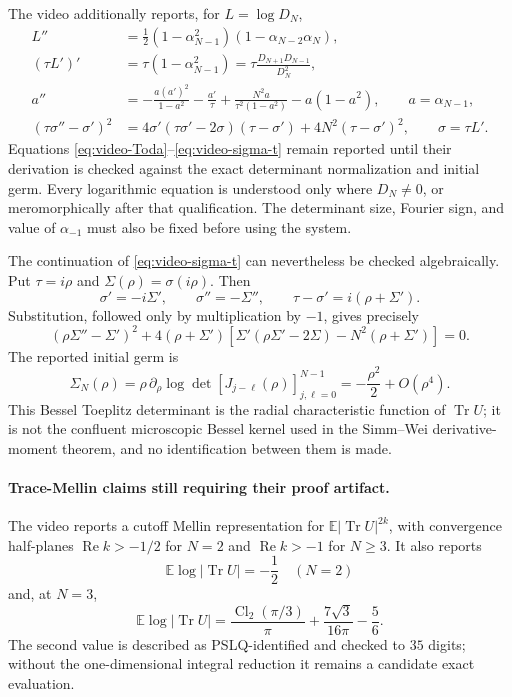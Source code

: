 The video additionally reports, for $L=\log D_N$,
\begin{align}
 L''
 &=\frac12(1-\alpha_{N-1}^2)(1-\alpha_{N-2}\alpha_N),
 \label{eq:video-Toda}\\
 (\tau L')'
 &=\tau(1-\alpha_{N-1}^2)
   =\tau\frac{D_{N+1}D_{N-1}}{D_N^2},
 \label{eq:video-TW-Dodgson}\\
 a''
 &=-\frac{a(a')^2}{1-a^2}-\frac{a'}{\tau}
   +\frac{N^2a}{\tau^2(1-a^2)}-a(1-a^2),
 \qquad a=\alpha_{N-1},
 \label{eq:video-PIII-a}\\
 (\tau\sigma''-\sigma')^2
 &=4\sigma'(\tau\sigma'-2\sigma)(\tau-\sigma')
   +4N^2(\tau-\sigma')^2,
 \qquad \sigma=\tau L'.
 \label{eq:video-sigma-t}
\end{align}
Equations \eqref{eq:video-Toda}--\eqref{eq:video-sigma-t} remain reported until their
derivation is checked against the exact determinant normalization and initial germ.
Every logarithmic equation is understood only where $D_N\neq0$, or meromorphically after
that qualification.  The determinant size, Fourier sign, and value of $\alpha_{-1}$ must
also be fixed before using the system.

The continuation of \eqref{eq:video-sigma-t} can nevertheless be checked algebraically.
Put $\tau=i\rho$ and $\Sigma(\rho)=\sigma(i\rho)$.  Then
\[
 \sigma'=-i\Sigma',\qquad \sigma''=-\Sigma'',
 \qquad \tau-\sigma'=i(\rho+\Sigma').
\]
Substitution, followed only by multiplication by $-1$, gives precisely
\begin{equation}
 (\rho\Sigma''-\Sigma')^2
 +4(\rho+\Sigma')
  \left[\Sigma'(\rho\Sigma'-2\Sigma)-N^2(\rho+\Sigma')\right]=0.
 \label{eq:video-sigma-rho}
\end{equation}
The reported initial germ is
\[
 \Sigma_N(\rho)=\rho\,\partial_\rho
 \log\det[J_{j-\ell}(\rho)]_{j,\ell=0}^{N-1}
 =-\frac{\rho^2}{2}+O(\rho^4).
\]
This Bessel Toeplitz determinant is the radial characteristic function of
$\operatorname{Tr}U$; it is not the confluent microscopic Bessel kernel used in the
Simm--Wei derivative-moment theorem, and no identification between them is made.

\paragraph{Trace-Mellin claims still requiring their proof artifact.}
The video reports a cutoff Mellin representation for
$\mathbb E|\operatorname{Tr}U|^{2k}$, with convergence half-planes
$\operatorname{Re}k>-1/2$ for $N=2$ and $\operatorname{Re}k>-1$ for $N\geq3$.
It also reports
\[
 \mathbb E\log|\operatorname{Tr}U|=-\frac12\quad(N=2)
\]
and, at $N=3$,
\begin{equation}
 \mathbb E\log|\operatorname{Tr}U|
 =\frac{\operatorname{Cl}_2(\pi/3)}{\pi}
  +\frac{7\sqrt3}{16\pi}-\frac56.
 \label{eq:video-trace-N3-log}
\end{equation}
The second value is described as PSLQ-identified and checked to $35$ digits; without the
one-dimensional integral reduction it remains a candidate exact evaluation.

